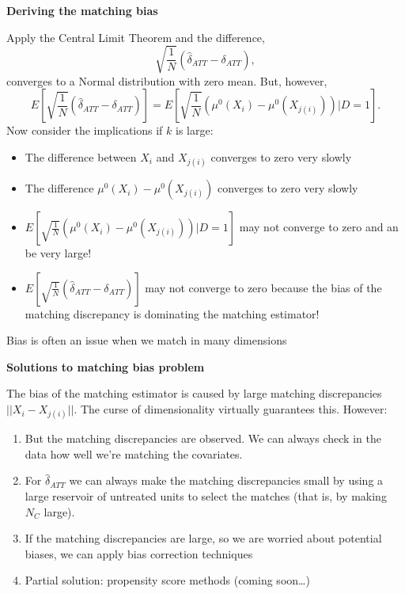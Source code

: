 \documentclass[notes=show]{beamer}
\begin{document}
\begin{frame}[plain]
	\begin{center}
	\textbf{Deriving the matching bias}
	\end{center}
	
Apply the Central Limit Theorem and the difference, $$\sqrt{\frac{1}{N}}(\widehat{\delta}_{ATT} - \delta_{ATT}),$$converges to a Normal distribution with zero mean.  But, however,$$E[ \sqrt{\frac{1}{N}} (\widehat{\delta}_{ATT} - \delta_{ATT})] = E[ \sqrt{\frac{1}{N}} ( \mu^0(X_i) - \mu^0(X_{j(i)}) ) | D=1].$$ Now consider the implications if $k$ is large:
	\begin{itemize}
	\item The difference between $X_i$ and $X_{j(i)}$ converges to zero very slowly
	\item The difference $\mu^0(X_i) - \mu^0(X_{j(i)})$ converges to zero very slowly
	\item $E[ \sqrt{\frac{1}{N}} (\mu^0(X_i) - \mu^0(X_{j(i)})) | D=1]$ may not converge to zero and an be very large!
	\item $E[ \sqrt{\frac{1}{N}} (\widehat{\delta}_{ATT} - \delta_{ATT})]$ may not converge to zero because the bias of the matching discrepancy is dominating the matching estimator!
	\end{itemize}
Bias is often an issue when we match in many dimensions
\end{frame}

\begin{frame}[plain]
	\begin{center}
	\textbf{Solutions to matching bias problem}
	\end{center}
	
The bias of the matching estimator is caused by large matching discrepancies $||X_i - X_{j(i)}||$. The curse of dimensionality virtually guarantees this.  However:
	\begin{enumerate}
	\item But the matching discrepancies are observed. We can always check in the data how well we're matching the covariates.
	\item For $\widehat{\delta}_{ATT}$ we can always make the matching discrepancies small by using a large reservoir of untreated units to select the matches (that is, by making $N_C$ large).
	\item If the matching discrepancies are large, so we are worried about potential biases, we can apply bias correction techniques
	\item Partial solution: propensity score methods (coming soon\dots)
	\end{enumerate}
\end{frame}
\end{document}
